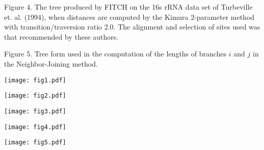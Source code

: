 \documentclass[12pt]{article}
\begin{document}
\noindent
{\sc Figure 4.}  The tree produced by FITCH on the 16s rRNA data set of
Turbeville et. al. (1994), when distances are computed by the Kimura 2-parameter
method with transition/traversion ratio 2.0.   The alignment and selection of
sites used was that recommended by these authors.
\bigskip

\noindent
{\sc Figure 5.}  Tree form used in the computation of the lengths of branches $i$
and $j$ in the Neighbor-Joining method.

\newpage

\centerline{\texttt{[image: fig1.pdf]}}

\newpage

\centerline{\texttt{[image: fig2.pdf]}}

\newpage

\centerline{\texttt{[image: fig3.pdf]}}

\newpage

\centerline{\texttt{[image: fig4.pdf]}}

\newpage

\centerline{\texttt{[image: fig5.pdf]}}
\end{document}
